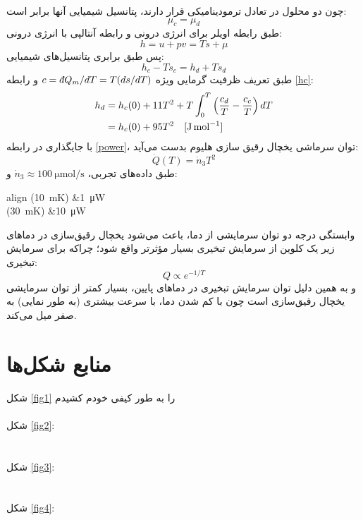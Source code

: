 \documentclass[12pt,a4paper]{article}
\newcommand{\dbar}{{d\mkern-7mu\mathchar'26\mkern-2mu}}
\begin{document}
	چون دو محلول در تعادل ترمودینامیکی قرار دارند، پتانسیل شیمیایی آنها برابر است:
	\begin{equation}
		\mu_c = \mu_d
	\end{equation}
	طبق رابطه اویلر برای انرژی درونی و رابطه آنتالپی با انرژی درونی:
	\begin{equation}
		h = u + pv = Ts + \mu
	\end{equation}
	پس طبق برابری پتانسیل‌های شیمیایی:
	\begin{equation}
		h_c - Ts_c = h_d + Ts_d
	\end{equation}
	طبق تعریف ظرفیت گرمایی ویژه $c = \dbar Q_m/dT = T(ds/dT)$ و رابطه \eqref{hc}:
	\begin{align}
		h_d &= h_c(0) + 11T^2 + T\int_0^T \qty(\frac{c_d}{T} - \frac{c_c}{T})\mathop{dT} \\
		&= h_c(0) + 95T^2 \quad [\si{\joule\per\mole}]
	\end{align}
	با جایگذاری در رابطه \eqref{power}، توان سرماشی یخچال رقیق سازی هلیوم بدست می‌آید:
	\begin{equation}
		\dot{Q}(T) = \dot{n}_3T^2
	\end{equation}
	طبق داده‌های تجربی، $\dot{n}_3 \approx \SI{100}{\micro\mole\per\second}$ و:
	\begin{empheq}[left=\empheqlbrace]{align}
		(\SI{10}{\milli\kelvin}) &\approx \SI{1}{\micro\watt} \\
		(\SI{30}{\milli\kelvin}) &\approx \SI{10}{\micro\watt}
	\end{empheq}
	وابستگی درجه دو توان سرمایشی از دما، باعث می‌شود یخچال رقیق‌سازی در دما‌های زیر یک کلوین از سرمایش تبخیری بسیار مؤثرتر واقع شود؛ چراکه برای سرمایش تبخیری:
	\begin{equation}
		Q \propto e^{-1/T}
	\end{equation}
	و به همین دلیل توان سرمایش تبخیری در دماهای پایین، بسیار کمتر از توان سرمایشی یخچال رقیق‌سازی است چون با کم شدن دما، با سرعت بیشتری (به طور نمایی) به صفر میل می‌کند.
	\setLTRbibitems
	
	
	\section*{منابع شکل‌ها}
	شکل \ref{fig1} را به طور کیفی خودم کشیدم \\ \\
	شکل \ref{fig2}: \\
	 \\ \\
	شکل \ref{fig3}: \\
	 \\ \\
	شکل \ref{fig4}: \\
\end{document}
